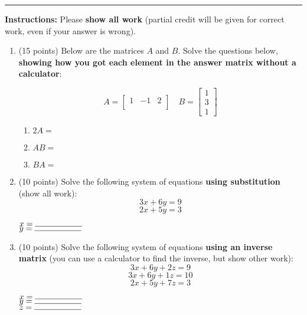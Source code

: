 \documentclass[11pt]{article}
\begin{document}
\Large


\medskip\hrule
\vspace{10pt}

\noindent \textbf{Instructions:} Please \textbf{show all work} (partial credit will be given for correct work, even if your answer is wrong).

\vspace{10pt}

\begin{enumerate}

\item (15 points) Below are the matrices $A$ and $B$.  Solve the questions below, \textbf{showing how you got each element in the answer matrix without a calculator}:

\[
A=
  \begin{bmatrix}
    1 & -1 & 2 \\
  \end{bmatrix} \quad
B=
  \begin{bmatrix}
    1 \\
    3 \\
    1
  \end{bmatrix}
\]

\begin{enumerate}[itemsep=100pt, label={\alph*)}]
    \item $\displaystyle 2A = $
    \item $\displaystyle AB = $
    \item $\displaystyle BA = $
\end{enumerate}

\vspace{50pt}

\newpage

\item (10 points) Solve the following system of equations \textbf{using substitution} (show all work): 
$$ 3x + 6y = 9 $$
$$ 2x + 5y = 3 $$
\vspace{80pt}
\begin{flushright}
$x = \rule{2cm}{0.4pt}$ \\
$y = \rule{2cm}{0.4pt}$
\end{flushright}


\item (10 points) Solve the following system of equations \textbf{using an inverse matrix} (you can use a calculator to find the inverse, but show other work): 
$$ 3x + 6y + 2z = 9 $$
$$ 3x + 6y + 1z = 10 $$
$$ 2x + 5y + 7z = 3 $$
\vspace{180pt}
\begin{flushright}
$x = \rule{2cm}{0.4pt}$ \\
$y = \rule{2cm}{0.4pt}$ \\
$z = \rule{2cm}{0.4pt}$
\end{flushright}


\end{enumerate}
\end{document}
